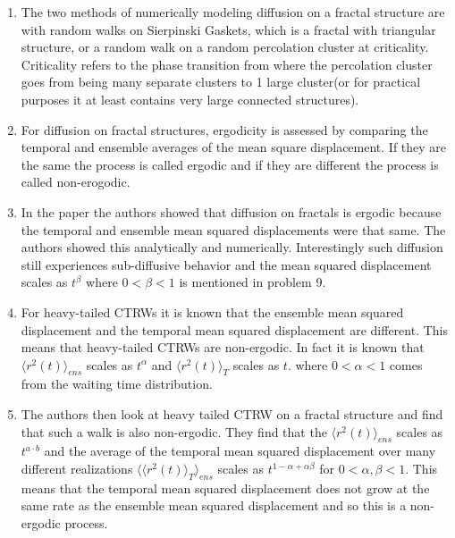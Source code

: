 \documentclass[12pt]{amsart}
\theoremstyle{definition}
\newcommand{\ip}[1]{\langle#1\rangle}
\begin{document}
\begin{enumerate}
\item The two methods of numerically modeling diffusion on a fractal structure are with random walks on Sierpinski Gaskets, which is a fractal with triangular structure, or a random walk on a random percolation cluster at criticality. Criticality refers to the phase transition from where the percolation cluster goes from being many separate clusters to 1 large cluster(or for practical purposes it at least contains very large connected structures).\\

\item For diffusion on fractal structures, ergodicity is assessed by comparing the temporal and ensemble averages of the mean square displacement. If they are the same the process is called ergodic and if they are different the process is called non-erogodic.\\ %

\item In the paper the authors showed that diffusion on fractals is ergodic because the temporal and ensemble mean squared displacements were that same. The authors showed this analytically and numerically. Interestingly such diffusion still experiences sub-diffusive behavior and the mean squared displacement scales as $t^\beta$ where $0<\beta<1$ is mentioned in problem 9.\\

\item For heavy-tailed CTRWs it is known that the ensemble mean squared displacement and the temporal mean squared displacement are different. This means that heavy-tailed CTRWs are non-ergodic. In fact it is known that $\ip{r^2(t)}_{ens}$ scales as $t^\alpha$ and $\ip{r^2(t)}_{T}$ scales as $t$. where $0< \alpha < 1$ comes from the waiting time distribution.\\

\item The authors then look at heavy tailed CTRW on a fractal structure and find that such a walk is also non-ergodic. They find that the $\ip{r^2(t)}_{ens}$ scales as $t^{a\cdot b}$ and the average of the temporal mean squared displacement  over many different realizations $\ip{\ip{r^2(t)}_{T}}_{ens}$ scales as $t^{1-\alpha+\alpha\beta}$ for $0<\alpha,\beta<1$. This means that the temporal mean squared displacement does not grow at the same rate as the ensemble mean squared displacement and so this is a non-ergodic process.\\


\end{enumerate}
\end{document}

